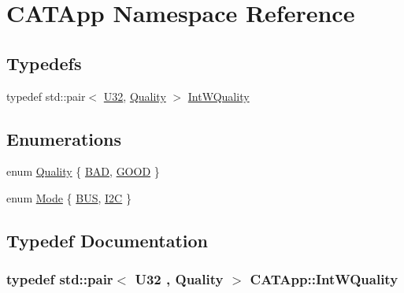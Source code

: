 \hypertarget{namespaceCATApp}{
\section{CATApp Namespace Reference}
\label{namespaceCATApp}
}
\subsection*{Typedefs}
\begin{DoxyCompactItemize}
\item 
typedef std::pair$<$ \hyperlink{LSDelayChipV1_8h_a811024d35b9b8a41095b1f583b649e56}{U32}, \hyperlink{namespaceCATApp_a10d106f6dbef9da3b1ba48892278b9c4}{Quality} $>$ \hyperlink{namespaceCATApp_abdd559c4b60ffcd177a8aabe5b7e4d38}{IntWQuality}
\end{DoxyCompactItemize}
\subsection*{Enumerations}
\begin{DoxyCompactItemize}
\item 
enum \hyperlink{namespaceCATApp_a10d106f6dbef9da3b1ba48892278b9c4}{Quality} \{ \hyperlink{namespaceCATApp_a10d106f6dbef9da3b1ba48892278b9c4acd3ed67aaacefc43a8086122a4b2ff11}{BAD}, 
\hyperlink{namespaceCATApp_a10d106f6dbef9da3b1ba48892278b9c4a38777cb47f97b9703919e12ca841f9a3}{GOOD}
 \}
\item 
enum \hyperlink{namespaceCATApp_addde02095b318dd29aad22bf91fbf5c7}{Mode} \{ \hyperlink{namespaceCATApp_addde02095b318dd29aad22bf91fbf5c7aa5eeb9b5908cf99ffe6cd93cf235579d}{BUS}, 
\hyperlink{namespaceCATApp_addde02095b318dd29aad22bf91fbf5c7af0a8d8add7a4fb23e99e6ea6e09e5a59}{I2C}
 \}
\end{DoxyCompactItemize}


\subsection{Typedef Documentation}
\hypertarget{namespaceCATApp_abdd559c4b60ffcd177a8aabe5b7e4d38}{
\subsubsection[{IntWQuality}]{\setlength{\rightskip}{0pt plus 5cm}typedef std::pair$<$ {\bf U32} , {\bf Quality} $>$ {\bf CATApp::IntWQuality}}}
\label{namespaceCATApp_abdd559c4b60ffcd177a8aabe5b7e4d38}



